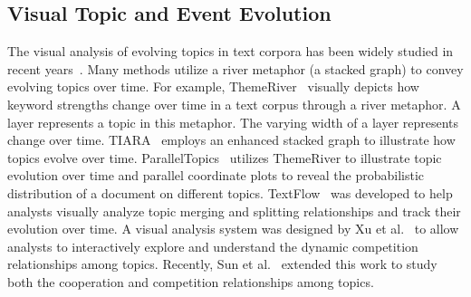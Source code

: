 
\subsection{Visual Topic and Event Evolution}

The visual analysis of evolving topics in text corpora has been widely studied in recent years~\cite{cui2011,Havre2002,Liu2014survey,Sun2013survey}.
Many methods utilize a river metaphor (a stacked graph) to convey evolving topics over time.
For example, ThemeRiver~\cite{Havre2002} visually depicts how keyword strengths change over time in a text corpus through a river metaphor.
A layer represents a topic in this metaphor.
The varying width of a layer represents  change over time.
TIARA~\cite{Liu2009,Liu2012}
employs an enhanced stacked graph to illustrate how topics evolve over time.
ParallelTopics~\cite{Dou2011} utilizes ThemeRiver to illustrate topic evolution over time and parallel coordinate plots to reveal the probabilistic distribution of a document on different topics.
TextFlow~\cite{cui2011} was developed to help analysts visually analyze topic merging and splitting relationships and track their evolution over time.
A visual analysis system was designed by Xu et al.~\cite{Xu2013} to allow analysts to interactively explore and understand the dynamic competition relationships among topics.
Recently, Sun et al.~\cite{GSun2014a} extended this work to study both the cooperation and competition relationships among topics.

